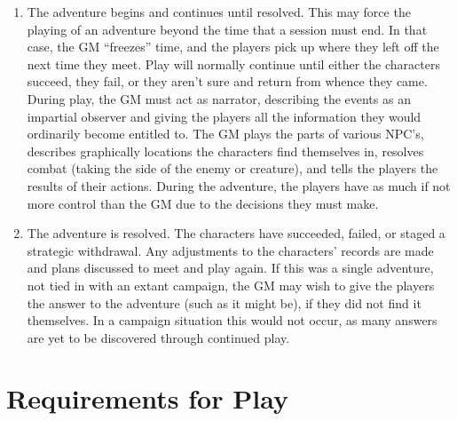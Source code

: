 \begin{enumerate}
\item The adventure begins and continues until resolved.  This may
  force the playing of an adventure beyond the time that a session
  must end.  In that case, the GM ``freezes'' time, and the players
  pick up where they left off the next time they meet.  Play will
  normally continue until either the characters succeed, they fail, or
  they aren't sure and return from whence they came.  During play, the
  GM must act as narrator, describing the events as an impartial
  observer and giving the players all the information they would
  ordinarily become entitled to.  The GM plays the parts of various
  NPC's, describes graphically locations the characters find
  themselves in, resolves combat (taking the side of the enemy or
  creature), and tells the players the results of their actions.
  During the adventure, the players have as much if not more control
  than the GM due to the decisions they must make.
  
\item The adventure is resolved.  The characters have succeeded,
  failed, or staged a strategic withdrawal.  Any adjustments to the
  characters' records are made and plans discussed to meet and play
  again.  If this was a single adventure, not tied in with an extant
  campaign, the GM may wish to give the players the answer to the
  adventure (such as it might be), if they did not find it themselves.
  In a campaign situation this would not occur, as many answers are
  yet to be discovered through continued play.
\end{enumerate}


\section{Requirements for Play}
\label{sec:requirements-play}




